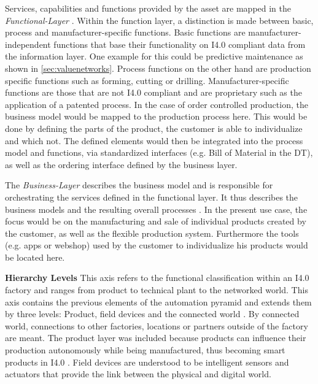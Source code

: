 Services, capabilities and functions provided by the asset are mapped in the \textit{Functional-Layer} \cite[p. 51]{Heidel2017ReferenzarchitekturmodellIndustrie4.0Komponente}. Within the function layer, a distinction is made between basic, process and manufacturer-specific functions. Basic functions are manufacturer-independent functions that base their functionality on \ac{I4.0} compliant data from the information layer. One example for this could be predictive maintenance as shown in \ref{sec:valuenetworks}. Process functions on the other hand are production specific functions such as forming, cutting or drilling. Manufacturer-specific functions are those that are not \ac{I4.0} compliant and are proprietary such as the application of a patented process. In the case of order controlled production, the business model would be mapped to the production process here. This would be done by defining the parts of the product, the customer is able to individualize and which not. The defined elements would then be integrated into the process model and functions, via standardized interfaces (e.g. Bill of Material in the \ac{DT}), as well as the ordering interface defined by the business layer.  
    
The \textit{Business-Layer} describes the business model and is responsible for orchestrating the services defined in the functional layer. It thus describes the business models and the resulting overall processes \cite[p. 53]{Heidel2017ReferenzarchitekturmodellIndustrie4.0Komponente}. In the present use case, the focus would be on the manufacturing and sale of individual products created by the customer, as well as the flexible production system. Furthermore the tools (e.g. apps or webshop) used by the customer to individualize his products would be located here.
    
\textbf{Hierarchy Levels} This axis refers to the functional classification within an \ac{I4.0} factory and ranges from product to technical plant to the networked world. This axis contains the previous elements of the automation pyramid and extends them by three levels: Product, field devices and the connected world \cite[p. 44]{Heidel2017ReferenzarchitekturmodellIndustrie4.0Komponente}. By connected world, connections to other factories, locations or partners outside of the factory are meant. The product layer was included because products can influence their production autonomously while being manufactured, thus becoming smart products in \ac{I4.0} \cite[p. 21]{Acatech2013Recommendations4.0}. Field devices are understood to be intelligent sensors and actuators that provide the link between the physical and digital world.

